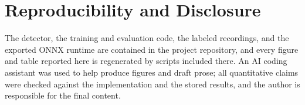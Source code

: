 \documentclass[conference]{IEEEtran}
\begin{document}
\section*{Reproducibility and Disclosure}
The detector, the training and evaluation code, the labeled recordings, and the exported ONNX
runtime are contained in the project repository, and every figure and table reported here is
regenerated by scripts included there. An AI coding assistant was used to help produce figures and
draft prose; all quantitative claims were checked against the implementation and the stored results,
and the author is responsible for the final content.

\clearpage



\end{document}
